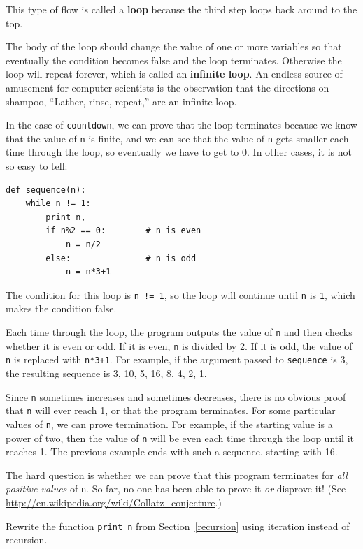 \documentclass[10pt]{book}
\begin{document}
This type of flow is called a {\bf loop} because the third step
loops back around to the top.  

The body of the loop should change the value of one or more variables
so that eventually the condition becomes false and the loop
terminates.  Otherwise the loop will repeat forever, which is called
an {\bf infinite loop}.  An endless source of amusement for computer
scientists is the observation that the directions on shampoo,
``Lather, rinse, repeat,'' are an infinite loop.

In the case of {\tt countdown}, we can prove that the loop
terminates because we know that the value of {\tt n} is finite, and we
can see that the value of {\tt n} gets smaller each time through the
loop, so eventually we have to get to 0.  In other
cases, it is not so easy to tell:

\begin{verbatim}
def sequence(n):
    while n != 1:
        print n,
        if n%2 == 0:        # n is even
            n = n/2
        else:               # n is odd
            n = n*3+1
\end{verbatim}
%
The condition for this loop is {\tt n != 1}, so the loop will continue
until {\tt n} is {\tt 1}, which makes the condition false.

Each time through the loop, the program outputs the value of {\tt n}
and then checks whether it is even or odd.  If it is even, {\tt n} is 
divided by 2.  If it is odd, the value of {\tt n} is replaced with
{\tt n*3+1}. For example, if the argument passed
to {\tt sequence} is 3, the resulting sequence is 3, 10, 5, 16, 8, 4, 2, 1.

Since {\tt n} sometimes increases and sometimes decreases, there is no
obvious proof that {\tt n} will ever reach 1, or that the program
terminates.  For some particular values of {\tt n}, we can prove
termination.  For example, if the starting value is a power of two,
then the value of {\tt n} will be even each time through the loop
until it reaches 1. The previous example ends with such a sequence,
starting with 16.

The hard question is whether we can prove that this program terminates
for {\em all positive values} of {\tt n}.  So far, no one has
been able to prove it {\em or} disprove it!  (See
  \url{http://en.wikipedia.org/wiki/Collatz_conjecture}.)

\begin{exercise}

Rewrite the function \verb"print_n" from
Section~\ref{recursion} using iteration instead of recursion.

\end{exercise}
\end{document}
